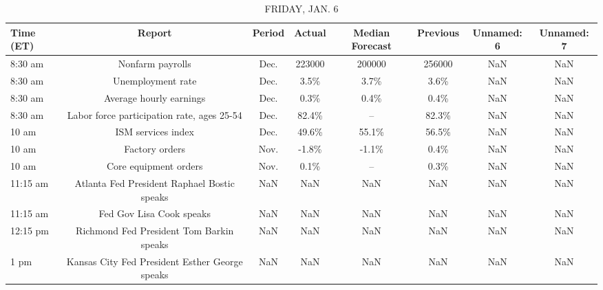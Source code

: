 \documentclass{article}%
\begin{document}
\begin{table}[htbp]%
\caption{FRIDAY, JAN. 6}%
\centering%
\begin{adjustbox}{width=1\textwidth}%
\begin{tabular}{lccccccc}
\toprule
Time (ET) &                                         Report & Period & Actual & Median Forecast & Previous & Unnamed: 6 & Unnamed: 7 \\
\midrule
  8:30 am &                               Nonfarm payrolls &   Dec. & 223000 &          200000 &   256000 &        NaN &        NaN \\
  8:30 am &                              Unemployment rate &   Dec. &   3.5\% &            3.7\% &     3.6\% &        NaN &        NaN \\
  8:30 am &                        Average hourly earnings &   Dec. &   0.3\% &            0.4\% &     0.4\% &        NaN &        NaN \\
  8:30 am &     Labor force participation rate, ages 25-54 &   Dec. &  82.4\% &              -- &    82.3\% &        NaN &        NaN \\
    10 am &                             ISM services index &   Dec. &  49.6\% &           55.1\% &    56.5\% &        NaN &        NaN \\
    10 am &                                 Factory orders &   Nov. &  -1.8\% &           -1.1\% &     0.4\% &        NaN &        NaN \\
    10 am &                          Core equipment orders &   Nov. &   0.1\% &              -- &     0.3\% &        NaN &        NaN \\
 11:15 am &    Atlanta Fed President Raphael Bostic speaks &    NaN &    NaN &             NaN &      NaN &        NaN &        NaN \\
 11:15 am &                       Fed Gov Lisa Cook speaks &    NaN &    NaN &             NaN &      NaN &        NaN &        NaN \\
 12:15 pm &       Richmond Fed President Tom Barkin speaks &    NaN &    NaN &             NaN &      NaN &        NaN &        NaN \\
     1 pm & Kansas City Fed President Esther George speaks &    NaN &    NaN &             NaN &      NaN &        NaN &        NaN \\
\bottomrule
\end{tabular}
%
\end{adjustbox}%
\end{table}
\end{document}
